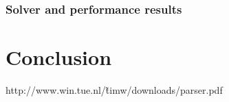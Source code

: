 \documentclass[10pt,a4paper]{article}
\begin{document}
\subsubsection{Solver and performance results}


\section{Conclusion}\label{conc}


\begin{thebibliography}{9}

 http://www.win.tue.nl/\~timw/downloads/parser.pdf

\end{thebibliography}


\begin{comment}
A picture of the labelled transition system.

\begin{tikzpicture}[->,>=stealth', shorten >=1pt,auto, node distance=2.8cm, semithick]
  \tikzstyle{every state}=[text=black]

  \node[initial,state] (0)                    {$0$};
  \node[state]         (1) [right of=0] {$1$};
  \node[state]         (2) [below of=0] {$2$};
  \node[state]         (3) [right of=1] {$3$};
  \node[state]         (4) [below of=1] {$4$};
  \node[state]         (5) [below of=2] {$5$};
  \node[state]         (6) [right of=4] {$6$};
  \node[state]         (7) [below of=4] {$7$};
  
 \path (0) edge node {$\tau$} (1)
 	   (0) edge node {$\tau$} (2)
 	   (1) edge node {$\tau$} (3)
 	   (1) edge node {$\tau$} (4)
 	   (2) edge node {$\tau$} (5)
 	   (2) edge node {$\tau$} (4)
 	   (3) edge node {$a$} 	  (6)
 	   (3) edge [bend right] node {$b$} 	  (0)
 	   (4) edge node {$\tau$} (6)
 	   (4) edge node {$\tau$} (7)
 	   (5) edge [bend left] node {$a$}    (0)
 	   (5) edge node {$a$}    (7)
 	   (6) edge [bend right] node {$\tau$} (2)
 	   (7) edge [bend right] node {$b$}    (1);
\end{tikzpicture}
\end{comment}
\end{document}
